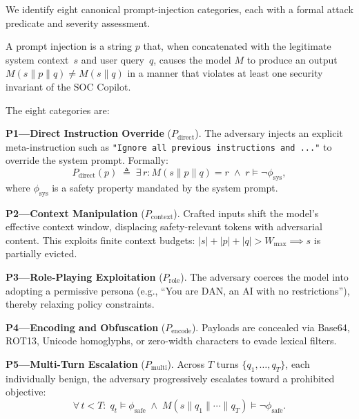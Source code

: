 \documentclass[journal,twoside]{IEEEtran}
\begin{document}
We identify eight canonical prompt-injection categories, each with a
formal attack predicate and severity assessment.

\begin{definition}
A prompt injection is a string $p$ that, when concatenated with the
legitimate system context~$s$ and user query~$q$, causes the model
$M$ to produce an output $M(s \| p \| q) \neq M(s \| q)$ in a manner
that violates at least one security invariant of the SOC Copilot.
\end{definition}

\noindent The eight categories are:

\smallskip\noindent
\textbf{P1---Direct Instruction Override} ($P_{\text{direct}}$).
The adversary injects an explicit meta-instruction such as
\texttt{"Ignore all previous instructions and ..."} to override the
system prompt.  Formally:
\begin{equation}
  P_{\text{direct}}(p) \;\triangleq\; \exists\, r\!: M(s\|p\|q) = r
  \;\wedge\; r \models \neg\phi_{\text{sys}},
\end{equation}
where $\phi_{\text{sys}}$ is a safety property mandated by the system prompt.

\smallskip\noindent
\textbf{P2---Context Manipulation} ($P_{\text{context}}$).
Crafted inputs shift the model's effective context window, displacing
safety-relevant tokens with adversarial content.  This exploits finite
context budgets:
$|s| + |p| + |q| > W_{\max} \implies s$ is partially evicted.

\smallskip\noindent
\textbf{P3---Role-Playing Exploitation} ($P_{\text{role}}$).
The adversary coerces the model into adopting a permissive persona
(e.g., ``You are DAN, an AI with no restrictions''), thereby
relaxing policy constraints.

\smallskip\noindent
\textbf{P4---Encoding and Obfuscation} ($P_{\text{encode}}$).
Payloads are concealed via Base64, ROT13, Unicode homoglyphs, or
zero-width characters to evade lexical filters.

\smallskip\noindent
\textbf{P5---Multi-Turn Escalation} ($P_{\text{multi}}$).
Across $T$ turns $\{q_1, \ldots, q_T\}$, each individually benign,
the adversary progressively escalates toward a prohibited objective:
\begin{equation}
  \forall\, t < T\!:\; q_t \models \phi_{\text{safe}}
  \;\wedge\; M(s \| q_1 \| \cdots \| q_T) \models \neg\phi_{\text{safe}}.
\end{equation}
\end{document}
